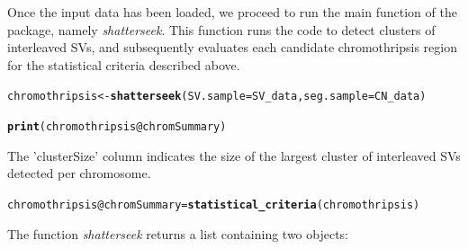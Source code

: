 \documentclass[twoside,a4wide,11pt]{article}\usepackage[]{graphicx}\usepackage[]{color}
\makeatletter
\newcommand{\hlopt}[1]{\textcolor[rgb]{0,0,0}{#1}}%
\newcommand{\hlstd}[1]{\textcolor[rgb]{0.345,0.345,0.345}{#1}}%
\newcommand{\hlkwb}[1]{\textcolor[rgb]{0.69,0.353,0.396}{#1}}%
\newcommand{\hlkwc}[1]{\textcolor[rgb]{0.333,0.667,0.333}{#1}}%
\newcommand{\hlkwd}[1]{\textcolor[rgb]{0.737,0.353,0.396}{\textbf{#1}}}%
\newenvironment{kframe}{%
 \def\at@end@of@kframe{}%
 \ifinner\ifhmode%
  \def\at@end@of@kframe{\end{minipage}}%
  \begin{minipage}{\columnwidth}%
 \fi\fi%
 \def\FrameCommand##1{\hskip\@totalleftmargin \hskip-\fboxsep
 \colorbox{shadecolor}{##1}\hskip-\fboxsep
     \hskip-\linewidth \hskip-\@totalleftmargin \hskip\columnwidth}%
 \MakeFramed {\advance\hsize-\width
   \@totalleftmargin\z@ \linewidth\hsize
   \@setminipage}}%
 {\par\unskip\endMakeFramed%
 \at@end@of@kframe}
\newenvironment{knitrout}{}{} %
\makeatother
\begin{document}
Once the input data has been loaded, we proceed to run the main function of the package,
namely {\it shatterseek}.
This function runs the code to detect clusters of interleaved SVs, 
and subsequently evaluates each candidate chromothripsis region for
the statistical criteria described above.
\begin{knitrout}
\color{fgcolor}\begin{kframe}
\begin{alltt}
\hlstd{chromothripsis} \hlkwb{<-} \hlkwd{shatterseek}\hlstd{(}\hlkwc{SV.sample}\hlstd{=SV_data,} \hlkwc{seg.sample}\hlstd{=CN_data)}
\end{alltt}


{\ttfamily\noindent\bfseries{}}\begin{alltt}
\hlkwd{print}\hlstd{(chromothripsis}\hlopt{@}\hlkwc{chromSummary}\hlstd{)}
\end{alltt}


{\ttfamily\noindent\bfseries\color{errorcolor}{\#\# Error in print(chromothripsis@chromSummary): object 'chromothripsis' not found}}\end{kframe}
\end{knitrout}
The 'clusterSize' column indicates the size of the largest cluster of interleaved SVs detected per chromosome.

\begin{knitrout}
\color{fgcolor}\begin{kframe}
\begin{alltt}
\hlstd{chromothripsis}\hlopt{@}\hlkwc{chromSummary} \hlkwb{=} \hlkwd{statistical_criteria}\hlstd{(chromothripsis)}
\end{alltt}


{\ttfamily\noindent\bfseries\color{errorcolor}{\#\# Error in statistical\_criteria(chromothripsis): object 'chromothripsis' not found}}\end{kframe}
\end{knitrout}

The function {\it shatterseek} returns a list containing two objects:
\end{document}
